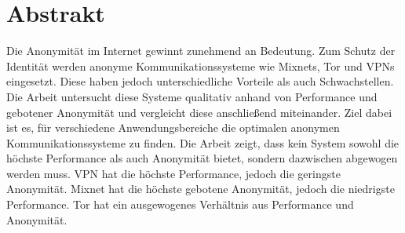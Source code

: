 \section{Abstrakt}

Die Anonymität im Internet gewinnt zunehmend an Bedeutung. Zum Schutz der Identität werden anonyme Kommunikationssysteme wie Mixnets, Tor und VPNs eingesetzt. Diese haben jedoch unterschiedliche Vorteile als auch Schwachstellen. Die Arbeit untersucht diese Systeme qualitativ anhand von Performance und gebotener Anonymität und vergleicht diese anschließend miteinander. Ziel dabei ist es, für verschiedene Anwendungsbereiche die optimalen anonymen Kommunikationssysteme zu finden. Die Arbeit zeigt, dass kein System sowohl die höchste Performance als auch Anonymität bietet, sondern dazwischen abgewogen werden muss. VPN hat die höchste Performance, jedoch die geringste Anonymität. Mixnet hat die höchste gebotene Anonymität, jedoch die niedrigste Performance. Tor hat ein ausgewogenes Verhältnis aus Performance und Anonymität.
